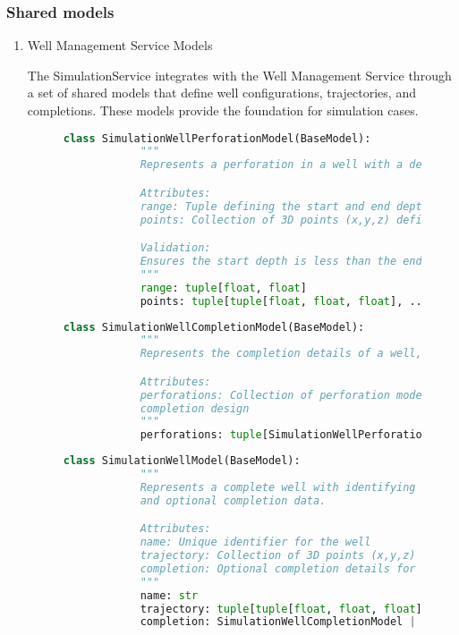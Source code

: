 \subsubsection{Shared models}
\begin{enumerate}
	\item Well Management Service Models

	The SimulationService integrates with the Well Management Service through a set of shared models that define well configurations, trajectories, and completions. These models provide the foundation for simulation cases.

	\begin{figure}[H]
		\begin{lstlisting}[language=Python, caption={SimulationWellPerforation Model}]
			class SimulationWellPerforationModel(BaseModel):
			"""
			Represents a perforation in a well with a depth range and 3D coordinate points.

			Attributes:
			range: Tuple defining the start and end depths of the perforation
			points: Collection of 3D points (x,y,z) defining the perforation geometry

			Validation:
			Ensures the start depth is less than the end depth
			"""
			range: tuple[float, float]
			points: tuple[tuple[float, float, float], ...]
		\end{lstlisting}
	\end{figure}

	\begin{figure}[H]
		\begin{lstlisting}[language=Python, caption={imulationWellCompletio nModel}]
			class SimulationWellCompletionModel(BaseModel):
			"""
			Represents the completion details of a well, containing perforations.

			Attributes:
			perforations: Collection of perforation models defining the well's
			completion design
			"""
			perforations: tuple[SimulationWellPerforationModel, ...]
		\end{lstlisting}
	\end{figure}

	\begin{figure}[H]
		\begin{lstlisting}[language=Python, caption={SimulationWell Model}]
			class SimulationWellModel(BaseModel):
			"""
			Represents a complete well with identifying information, trajectory,
			and optional completion data.

			Attributes:
			name: Unique identifier for the well
			trajectory: Collection of 3D points (x,y,z) defining the well path
			completion: Optional completion details for the well
			"""
			name: str
			trajectory: tuple[tuple[float, float, float], ...]
			completion: SimulationWellCompletionModel | None = Field(default=None)
		\end{lstlisting}
	\end{figure}


\end{enumerate}
